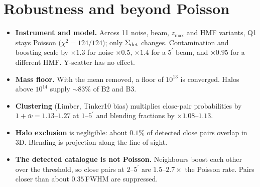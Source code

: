 \documentclass[10pt]{article}
\newcommand{\amin}{^{\prime}}
\begin{document}
\section{Robustness and beyond Poisson}
\begin{itemize}
\item \textbf{Instrument and model.} Across 11 noise, beam, $z_{\max}$ and HMF variants, Q1 stays Poisson ($\chi^2=124/124$); only $\Sigma_{\rm det}$ changes. Contamination and boosting scale by $\times1.3$ for noise $\times0.5$, $\times1.4$ for a $5\amin$ beam, and $\times0.95$ for a different HMF. Y-scatter has no effect.
\item \textbf{Mass floor.} With the mean removed, a floor of $10^{13}$ is converged. Halos above $10^{14}$ supply $\sim$83\% of B2 and B3.
\item \textbf{Clustering} (Limber, Tinker10 bias) multiplies close-pair probabilities by $1+\bar w=1.13$--$1.27$ at $1$--$5\amin$ and blending fractions by $\times1.08$--$1.13$.
\item \textbf{Halo exclusion} is negligible: about $0.1\%$ of detected close pairs overlap in 3D. Blending is projection along the line of sight.
\item \textbf{The detected catalogue is not Poisson.} Neighbours boost each other over the threshold, so close pairs at $2$--$5\amin$ are $1.5$--$2.7\times$ the Poisson rate. Pairs closer than about $0.35\,$FWHM are suppressed.
\end{itemize}
\end{document}
